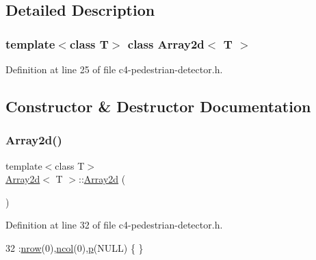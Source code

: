 \subsection{Detailed Description}
\subsubsection*{template$<$class T$>$\newline
class Array2d$<$ T $>$}



Definition at line 25 of file c4-\/pedestrian-\/detector.\+h.



\subsection{Constructor \& Destructor Documentation}
\mbox{\label{class_array2d_a8c4b92d7f309ef043458835cc3fd2e14}} 
\subsubsection{\texorpdfstring{Array2d()}{Array2d()}\hspace{0.1cm}{\footnotesize\ttfamily [1/3]}}
{\footnotesize\ttfamily template$<$class T$>$ \\
\mbox{\hyperlink{class_array2d}{Array2d}}$<$ T $>$\+::\mbox{\hyperlink{class_array2d}{Array2d}} (\begin{DoxyParamCaption}{ }\end{DoxyParamCaption})\hspace{0.3cm}{\ttfamily [inline]}}



Definition at line 32 of file c4-\/pedestrian-\/detector.\+h.


\begin{DoxyCode}
32 :\mbox{\hyperlink{class_array2d_a373dd63664bee40ef720d183d03e5bdb}{nrow}}(0),\mbox{\hyperlink{class_array2d_afe48cd05774cae5b6872324ae49e089b}{ncol}}(0),\mbox{\hyperlink{class_array2d_ac7b70bc423364c43c7c174cdde515380}{p}}(NULL) \{ \}
\end{DoxyCode}
\mbox{\label{class_array2d_ac7c55fd62aeda8ffb83e6c4ae39a2488}} 
